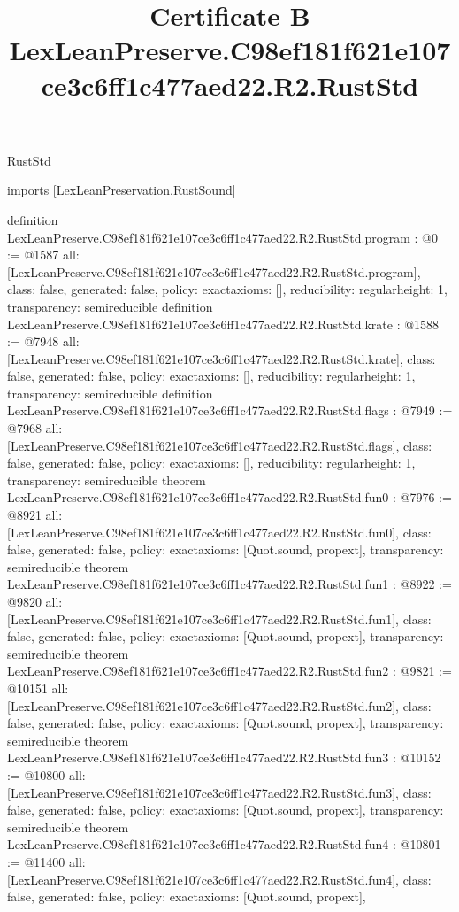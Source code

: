 \begin{lexlean}{RustStd}
\title{Certificate B LexLeanPreserve.C98ef181f621e107ce3c6ff1c477aed22.R2.RustStd}
\begin{coremodule}
imports [LexLeanPreservation.RustSound]

definition LexLeanPreserve.C98ef181f621e107ce3c6ff1c477aed22.R2.RustStd.program : @0 := @1587 {
  all: [LexLeanPreserve.C98ef181f621e107ce3c6ff1c477aed22.R2.RustStd.program],
  class: false,
  generated: false,
  policy: exact{axioms: []},
  reducibility: regular{height: 1},
  transparency: semireducible
}
definition LexLeanPreserve.C98ef181f621e107ce3c6ff1c477aed22.R2.RustStd.krate : @1588 := @7948 {
  all: [LexLeanPreserve.C98ef181f621e107ce3c6ff1c477aed22.R2.RustStd.krate],
  class: false,
  generated: false,
  policy: exact{axioms: []},
  reducibility: regular{height: 1},
  transparency: semireducible
}
definition LexLeanPreserve.C98ef181f621e107ce3c6ff1c477aed22.R2.RustStd.flags : @7949 := @7968 {
  all: [LexLeanPreserve.C98ef181f621e107ce3c6ff1c477aed22.R2.RustStd.flags],
  class: false,
  generated: false,
  policy: exact{axioms: []},
  reducibility: regular{height: 1},
  transparency: semireducible
}
theorem LexLeanPreserve.C98ef181f621e107ce3c6ff1c477aed22.R2.RustStd.fun0 : @7976 := @8921 {
  all: [LexLeanPreserve.C98ef181f621e107ce3c6ff1c477aed22.R2.RustStd.fun0],
  class: false,
  generated: false,
  policy: exact{axioms: [Quot.sound, propext]},
  transparency: semireducible
}
theorem LexLeanPreserve.C98ef181f621e107ce3c6ff1c477aed22.R2.RustStd.fun1 : @8922 := @9820 {
  all: [LexLeanPreserve.C98ef181f621e107ce3c6ff1c477aed22.R2.RustStd.fun1],
  class: false,
  generated: false,
  policy: exact{axioms: [Quot.sound, propext]},
  transparency: semireducible
}
theorem LexLeanPreserve.C98ef181f621e107ce3c6ff1c477aed22.R2.RustStd.fun2 : @9821 := @10151 {
  all: [LexLeanPreserve.C98ef181f621e107ce3c6ff1c477aed22.R2.RustStd.fun2],
  class: false,
  generated: false,
  policy: exact{axioms: [Quot.sound, propext]},
  transparency: semireducible
}
theorem LexLeanPreserve.C98ef181f621e107ce3c6ff1c477aed22.R2.RustStd.fun3 : @10152 := @10800 {
  all: [LexLeanPreserve.C98ef181f621e107ce3c6ff1c477aed22.R2.RustStd.fun3],
  class: false,
  generated: false,
  policy: exact{axioms: [Quot.sound, propext]},
  transparency: semireducible
}
theorem LexLeanPreserve.C98ef181f621e107ce3c6ff1c477aed22.R2.RustStd.fun4 : @10801 := @11400 {
  all: [LexLeanPreserve.C98ef181f621e107ce3c6ff1c477aed22.R2.RustStd.fun4],
  class: false,
  generated: false,
  policy: exact{axioms: [Quot.sound, propext]},
}
\end{coremodule}
\end{lexlean}
